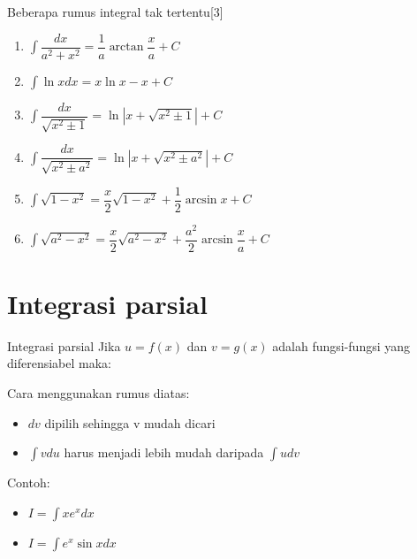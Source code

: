 \documentclass{beamer}
\newcounter{saveenumi}
\newcommand{\conti}{\setcounter{enumi}{\value{saveenumi}}}
\begin{document}
\begin{frame}[t, fragile]{Beberapa rumus integral tak tertentu[3]}
\begin{enumerate}
\conti
\item $\int \dfrac{dx}{a^2+x^2} = \dfrac{1}{a} \arctan \dfrac{x}{a} + C$
\item $\int \ln x dx = x \ln x - x + C$
\item $\int \dfrac{dx}{\sqrt{x^2 \pm 1}} = \ln | x+ \sqrt{x^2 \pm 1} |+ C$
\item $\int \dfrac{dx}{\sqrt{x^2 \pm a^2}} = \ln | x+ \sqrt{x^2 \pm a^2} |+ C$
\item $\int \sqrt{1-x^2 } = \dfrac{x}{2}\sqrt{1-x^2 }+ \dfrac{1}{2} \arcsin x + C$
\item $\int \sqrt{a^2-x^2 } = \dfrac{x}{2}\sqrt{a^2-x^2 }+ \dfrac{a^2}{2} \arcsin \dfrac {x}{a} + C$
\end{enumerate}
\end{frame}

\section{Integrasi parsial}
\begin{frame}[t, fragile]{Integrasi parsial}
Jika $u=f(x)$ dan $v=g(x)$ adalah fungsi-fungsi yang diferensiabel maka: \\
\begin{center}
\end{center}
Cara menggunakan rumus diatas:\\
\begin{itemize}
\item $dv$ dipilih sehingga v mudah dicari
\item $\int v du$ harus menjadi lebih mudah daripada $\int u dv$
\end{itemize}
Contoh: \\
\begin{itemize}
\item $I = \int x e^x dx$
\item $I = \int e^x \sin{x} dx$
\end{itemize}
\end{frame}
\end{document}
